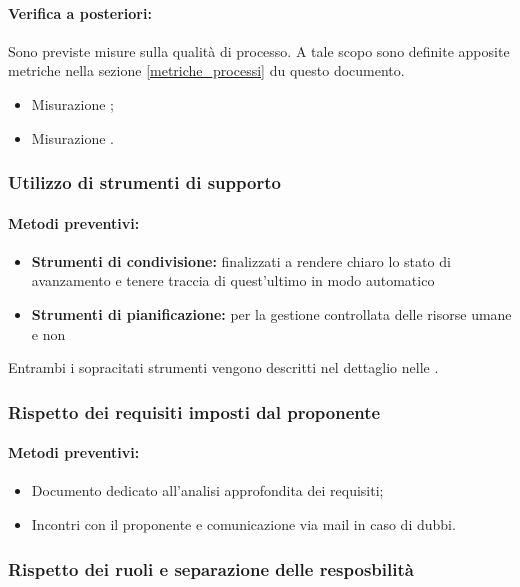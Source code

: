 \documentclass[12pt,a4paper]{article}
\begin{document}
\paragraph{Verifica a posteriori:} Sono previste misure sulla qualità di processo. A tale scopo sono definite apposite metriche nella sezione \ref{metriche_processi} du questo documento.
\begin{itemize}
	\item Misurazione ;
	\item Misurazione .
\end{itemize}

\subsubsection{Utilizzo di strumenti di supporto}
\paragraph{Metodi preventivi:}
\begin{itemize}
	\item \textbf{Strumenti di condivisione:} finalizzati a rendere chiaro lo stato di avanzamento e tenere traccia di quest'ultimo in modo automatico
	\item \textbf{Strumenti di pianificazione:} per la gestione controllata delle risorse umane e non
\end{itemize}
Entrambi i sopracitati strumenti vengono descritti nel dettaglio nelle \NdP{}.

\subsubsection{Rispetto dei requisiti imposti dal proponente \Zucchetti{}}
\paragraph{Metodi preventivi:}
\begin{itemize}
	\item Documento dedicato all'analisi approfondita dei requisiti;
	\item Incontri con il proponente e comunicazione via mail in caso di dubbi.
\end{itemize}

\subsubsection{Rispetto dei ruoli e separazione delle resposbilità}
\end{document}
